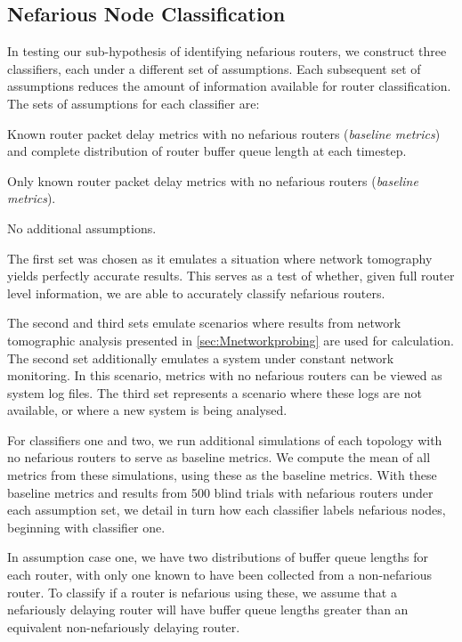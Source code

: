 \subsection{Nefarious Node Classification}
\label{ssec:MTruevalues}
In testing our sub-hypothesis of identifying nefarious routers, we construct three classifiers, each under a different set of assumptions. Each subsequent set of assumptions reduces the amount of information available for router classification. The sets of assumptions for each classifier are:
\begin{description}[labelindent=1cm]
  \item[Classifier 1:] Known router packet delay metrics with no nefarious routers (\textit{baseline metrics}) and complete distribution of router buffer queue length at each timestep.
  \item[Classifier 2:] Only known router packet delay metrics with no nefarious routers (\textit{baseline metrics}).
  \item[Classifier 3:] No additional assumptions.
\end{description}
The first set was chosen as it emulates a situation where network tomography yields perfectly accurate results. This serves as a test of whether, given full router level information, we are able to accurately classify nefarious routers.\par
The second and third sets emulate scenarios where results from network tomographic analysis presented in \cref{sec:Mnetworkprobing} are used for calculation. The second set additionally emulates a system under constant network monitoring. In this scenario, metrics with no nefarious routers can be viewed as system log files. The third set represents a scenario where these logs are not available, or where a new system is being analysed.\par
For classifiers one and two, we run additional simulations of each topology with no nefarious routers to serve as baseline metrics. We compute the mean of all metrics from these simulations, using these as the baseline metrics. With these baseline metrics and results from 500 blind trials with nefarious routers under each assumption set, we detail in turn how each classifier labels nefarious nodes, beginning with classifier one.\par
In assumption case one, we have two distributions of buffer queue lengths for each router, with only one known to have been collected from a non-nefarious router. To classify if a router is nefarious using these, we assume that a nefariously delaying router will have buffer queue lengths greater than an equivalent non-nefariously delaying router.\par
